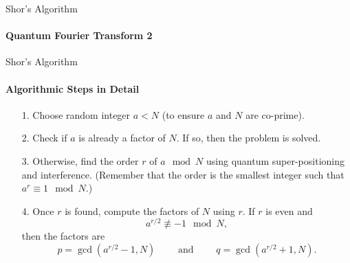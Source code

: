 \documentclass{beamer}
\begin{document}




\begin{frame}{Shor's Algorithm}
	\framesubtitle{Quantum Fourier Transform 2}
    
\end{frame}




\begin{frame}{Shor's Algorithm}
	\framesubtitle{Algorithmic Steps in Detail}
	\begin{itemize}
		\item[1.] Choose random integer \(a < N\) (to ensure \(a\) and \(N\) are co-prime).
		\pause
		\item[2.] Check if \(a\) is already a factor of \(N\). If so, then the problem is solved.
		\pause
		\item[3.] Otherwise, find the order \(r\) of \(a \mod N\) using quantum super-positioning and interference. (Remember that the order is the smallest integer such that \(a^r \equiv 1 \mod N\).)
		\pause
		\item[4.] Once \(r\) is found, compute the factors of \(N\) using \(r\). If \(r\) is even and 
		\[
			a^{r/2} \not\equiv -1 \mod N,
		\] 
		then the factors are 
		\[
			p = \gcd(a^{r/2} - 1, N) \qquad \text{ and } \qquad q = \gcd(a^{r/2} + 1, N).
		\] 
	\end{itemize}
	
\end{frame}



\end{document}
